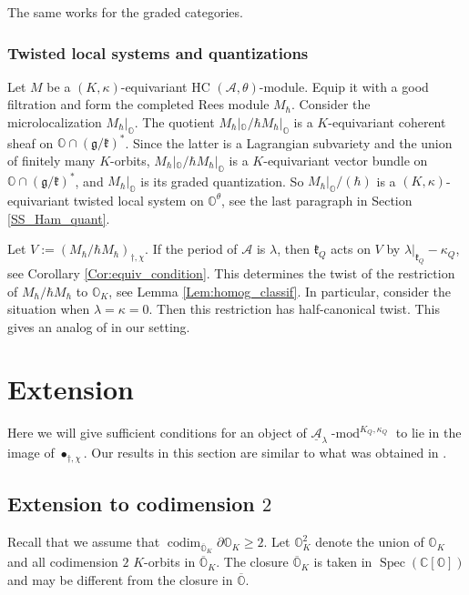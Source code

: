 \documentclass[12pt]{amsart}
\newcommand{\C}{\mathbb{C}}
\newcommand{\A}{\mathcal{A}}
\newcommand{\g}{\mathfrak{g}}
\newcommand{\Orb}{\mathbb{O}}
\newcommand{\kf}{\mathfrak{k}}
\theoremstyle{definition}
\numberwithin{equation}{section}
\begin{document}
The same works for the graded categories.

\subsubsection{Twisted local systems and quantizations}\label{SSS_tw_loc_quant}
Let $M$ be a $(K,\kappa)$-equivariant HC $(\A,\theta)$-module. Equip it with a good filtration
and form the completed Rees module $M_\hbar$. Consider the microlocalization $M_\hbar|_{\Orb}$.
The quotient $M_\hbar|_{\Orb}/ \hbar M_\hbar|_{\Orb}$ is a $K$-equivariant coherent sheaf on
$\Orb\cap (\g/\kf)^*$. Since the latter is a Lagrangian subvariety and the union of finitely
many $K$-orbits, $M_\hbar|_{\Orb}/ \hbar M_\hbar|_{\Orb}$ is a $K$-equivariant vector 
bundle on $\Orb\cap (\g/\kf)^*$, and $M_\hbar|_{\Orb}$ is its graded quantization. 
So $M_\hbar|_{\Orb}/(\hbar)$ is a $(K,\kappa)$-equivariant twisted local system on $\Orb^\theta$,
see the last paragraph in Section \ref{SS_Ham_quant}.

Let $V:=(M_\hbar/\hbar M_\hbar)_{\dagger,\chi}$. If the period of $\A$ is $\lambda$, then
$\kf_Q$ acts on $V$ by $\lambda|_{\kf_Q}-\kappa_Q$, see Corollary \ref{Cor:equiv_condition}.
This determines the twist of the restriction of $M_\hbar/\hbar M_\hbar$ to $\Orb_K$,
see Lemma \ref{Lem:homog_classif}. In particular, consider the situation when $\lambda=\kappa=0$.
Then this restriction has half-canonical twist. This gives an analog of \cite[Theorem 8.7]{Vogan}
in our setting.


\section{Extension}\label{sec:extn}
Here we will give sufficient conditions for an object of
$\underline{\A}_\lambda\operatorname{-mod}^{K_Q,\kappa_Q}$
to lie in the image of $\bullet_{\dagger,\chi}$.  Our results
in this section are similar to what was obtained in \cite[Section 3]{HC_symp}.



\subsection{Extension to codimension $2$} \label{subsec:extn_codim2}
Recall that we assume that $\operatorname{codim}_{\overline{\Orb}_K}\partial\Orb_K\geqslant 2$.
Let $\Orb_K^2$ denote the union of $\Orb_K$ and all codimension $2$ $K$-orbits
in $\overline{\Orb}_K$. The closure $\overline{\Orb}_K$ is taken in $\operatorname{Spec}(\C[\Orb])$
and may be different from the closure in $\overline{\Orb}$.
\end{document}
